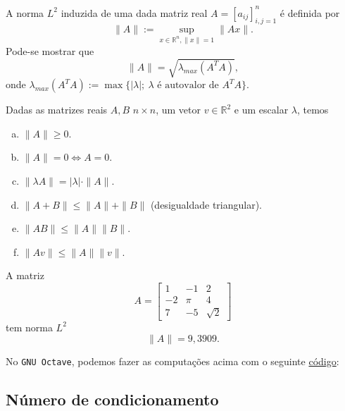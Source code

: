 A norma $L^2$ induzida de uma dada matriz real $A = [a_{ij}]_{i,j=1}^n$ é definida por
\begin{equation}
  \|A\| := \sup_{x\in\mathbb{R}^n, \|x\|=1} \|Ax\|.
\end{equation}
Pode-se mostrar que
\begin{equation}
  \|A\| = \sqrt{\lambda_{max}(A^TA)},
\end{equation}
onde $\lambda_{max}(A^TA) := \max\{|\lambda|;~\lambda\text{ é autovalor de }A^TA\}$.

\begin{prop}
  Dadas as matrizes reais $A, B$ $n\times n$, um vetor $v\in\mathbb{R}^2$ e um escalar $\lambda$, temos
  \begin{enumerate}[a)]
  \item $\|A\| \geq 0$.
  \item $\|A\|=0 \Leftrightarrow A=0$.
  \item $\|\lambda A\| = |\lambda|\cdot \|A\|$.
  \item $\|A+B\| \leq \|A\| + \|B\|$ (desigualdade triangular).
  \item $\|AB\| \leq \|A\|\|B\|$.
  \item $\|Av\| \leq \|A\|\|v\|$.
  \end{enumerate}
\end{prop}

\begin{ex}\label{ex:norma_matriz}
  A matriz
  \begin{equation}
    A =
    \begin{bmatrix}
      1 & -1 & 2\\
      -2 & \pi & 4\\
      7 & -5 & \sqrt{2}
    \end{bmatrix}
  \end{equation}
tem norma $L^2$
\begin{equation}
  \|A\| = 9,3909.
\end{equation}

\ifisoctave
No \verb+GNU Octave+, podemos fazer as computações acima com o seguinte \href{https://github.com/phkonzen/notas/blob/master/src/MatematicaNumerica/cap_sl_direto/dados/ex_norma_matriz/ex_norma_matriz.m}{código}:

\fi
\end{ex}

\subsection{Número de condicionamento}

